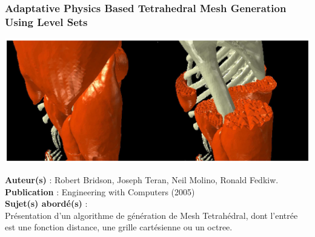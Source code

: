 \documentclass[a4paper,10pt]{article}
\begin{document}
\subsubsection{Adaptative Physics Based Tetrahedral Mesh Generation Using Level Sets}
    \begin{center}
	\includegraphics[scale=0.5]{Adaptative.ps}
    \end{center}
\textbf{Auteur(s)} : Robert Bridson, Joseph Teran, Neil Molino, Ronald Fedkiw.\\
\textbf{Publication} : Engineering with Computers (2005)\\
\textbf{Sujet(s) abordé(s)} : \\
	Présentation d'un algorithme de génération de Mesh Tetrahédral, dont l'entrée est une fonction distance, une grille cartésienne ou un octree.






\end{document}
